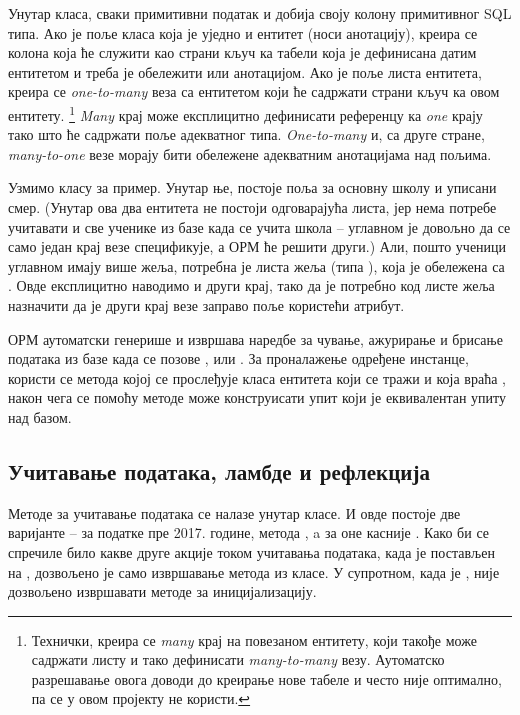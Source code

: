 Унутар класа, сваки примитивни податак и  добија своју колону примитивног SQL типа. Ако је поље класа која је уједно и ентитет (носи  анотацију), креира се колона која ће служити као страни кључ ка табели која је дефинисана датим ентитетом и треба је обележити  или  анотацијом. Ако је поље листа ентитета, креира се \emph{one-to-many} веза са ентитетом који ће садржати страни кључ ка овом ентитету. \footnote{Технички, креира се \textit{many} крај на повезаном ентитету, који такође може садржати листу и тако дефинисати \emph{many-to-many} везу. Аутоматско разрешавање овога доводи до креирање нове табеле и често није оптимално, па се у овом пројекту не користи.} \textit{Many} крај може експлицитно дефинисати референцу ка \textit{one} крају тако што ће садржати поље адекватног типа. \textit{One-to-many} и, са друге стране, \emph{many-to-one} везе морају бити обележене адекватним анотацијама над пољима.

Узмимо класу  за пример. Унутар ње, постоје  поља за основну школу и уписани смер. (Унутар ова два ентитета не постоји одговарајућа листа, јер нема потребе учитавати и све ученике из базе када се учита школа -- углавном је довољно да се само један крај везе спецификује, а ОРМ ће решити други.) Али, пошто ученици углавном имају више жеља, потребна је листа жеља (типа ), која је обележена са . Овде експлицитно наводимо и други крај, тако да је потребно код листе жеља назначити да је други крај везе заправо поље  користећи  атрибут.

ОРМ аутоматски генерише и извршава наредбе за чување, ажурирање и брисање података из базе када се позове ,  или . За проналажење одређене инстанце, користи се  метода којој се прослеђује класа ентитета који се тражи и која враћа , након чега се помоћу  методе може конструисати упит који је еквивалентан  упиту над базом.

\subsection{Учитавање података, ламбде и рефлекција}\label{subs:refl}

Методе за учитавање података се налазе унутар  класе. И овде постоје две варијанте -- за податке пре 2017. године, метода , a за оне касније . Како би се спречиле било какве друге акције током учитавања података, када је  постављен на , дозвољено је само извршавање метода из  класе. У супротном, када је   , није дозвољено извршавати методе за иницијализацију.

